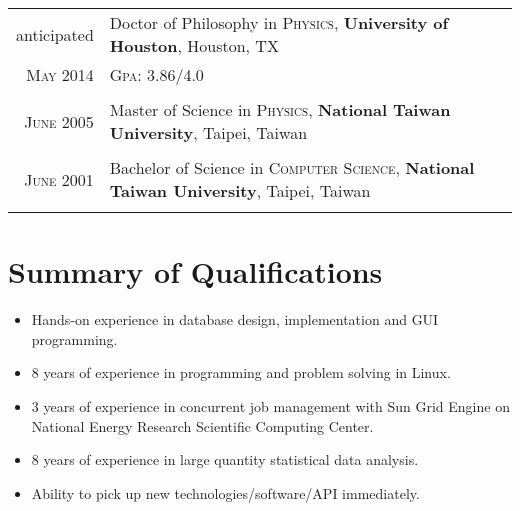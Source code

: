 \documentclass[11pt]{article} %
\begin{document}
\begin{tabular}{rl}
anticipated & Doctor of Philosophy in \textsc{Physics}, \textbf{University of Houston}, Houston, TX\\
\textsc{May} 2014 &\normalsize \textsc{Gpa}: 3.86/4.0 \\%
&\\


\textsc{June} 2005 & Master of Science in \textsc{Physics}, \textbf{National Taiwan University}, Taipei, Taiwan \\
&\\


\textsc{June} 2001 & Bachelor of Science in \textsc{Computer Science}, \textbf{National Taiwan University}, Taipei, Taiwan\\
&\\


\end{tabular}



\section{Summary of Qualifications}
\begin{itemize}
	\item Hands-on experience in database design, implementation and GUI programming.
  \item 8 years of experience in programming and problem solving in Linux.
  \item 3 years of experience in concurrent job management with Sun Grid Engine on National Energy Research Scientific Computing Center.
  \item 8 years of experience in large quantity statistical data analysis.
  \item Ability to pick up new technologies/software/API immediately.
\end{itemize}


\end{document}
